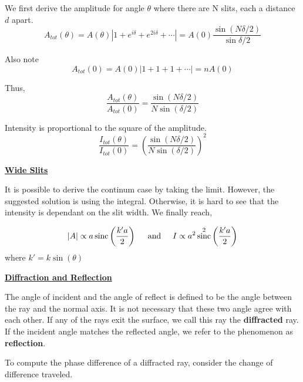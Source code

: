 \documentclass{article}
\newcommand{\new}[1]{
    \vspace{2mm}
    \noindent
    \textbf{
    \underline{#1}}
}
\DeclareMathOperator{\sinc}{sinc}
\newcommand{\textAnd}{
    {
        \hspace{5mm}
        \textrm{and}
        \hspace{5mm}
    }
}
\begin{document}
We first derive the amplitude for angle $\theta$ where there are 
N slits, each a distance $d$ apart. 
\[
    A_{tot}(\theta) = 
    A(\theta)\left| 
        1 + e^{i\delta} + e^{2i\delta} +\cdots
    \right|
    = A(0) \frac {\sin(N\delta/2)} {\sin{\delta / 2}} 
\]

Also note 
\[
    A_{tot}(0) = A(0)\left| 
        1 + 1 + 1 +\cdots 
    \right|
    = n A(0) 
\]

Thus, 
\[
    \frac{A_{tot}(\theta) }{A_{tot}(0)} = 
    \frac{\sin(N\delta/2)}{N\sin(\delta/2)}
\]

Intensity is proportional to the square of the amplitude. 
\[
   \frac { I_{tot}(\theta)} {I_{tot}(0)} 
   =\left( \frac{\sin(N\delta/2)}{N\sin(\delta/2)}\right)^2
\]

\new{Wide Slits}
It is possible to derive the continum case by taking the limit. 
However, the suggested solution is using the integral. Otherwise, 
it is hard to see that the intensity is dependant on the 
slit width. We finally reach, 

\[
    |A| \propto a \sinc\left(
        \frac {k'a} 2
    \right)
    \textAnd
    I
\propto a^2 \sinc^2\left(
        \frac {k'a} 2
    \right)
\]
where $k' = k\sin(\theta)$

\new{Diffraction and Reflection}
The angle of incident and the angle of reflect 
is defined to be the angle between the 
ray and the normal axis. It is not necessary that 
these two angle agree with each other. If any of the 
rays exit the surface, we call this ray the 
\textbf{diffracted} ray. If the incident angle 
matches the reflected angle, we refer to 
the phenomenon as \textbf{reflection}. 

To compute the phase difference of a diffracted 
ray, consider the change of difference traveled. 
\end{document}
